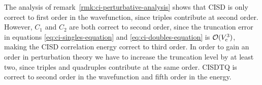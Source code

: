 \documentclass[11pt]{article}
\numberwithin{equation}{section}
\begin{document}
\begin{ex}
\label{ex:analysis-of-cisd-throuh-q}
The analysis of remark~\ref{rmk:ci-perturbative-analysis} shows that CISD is only correct to first order in the wavefunction, since triples contribute at second order.
However, $C_1$ and $C_2$ are both correct to second order, since the truncation error in equations \ref{eq:ci-singles-equation} and \ref{eq:ci-doubles-equation} is $\mathcal{O}(V_{\mathrm{c}}^3)$, making the CISD correlation energy correct to third order.
In order to gain an order in perturbation theory we have to increase the truncation level by at least two, since triples and quadruples contribute at the same order.
CISDTQ is correct to second order in the wavefunction and fifth order in the energy.
\end{ex}

\begin{prop}
\label{prop:ci-orders}
\end{prop}
\end{document}
